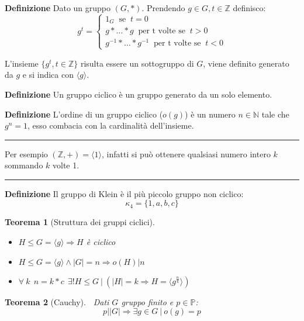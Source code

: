 \documentclass{article}
\newtheorem{theorem}{Teorema}
\begin{document}
\textbf{Definizione} Dato un gruppo $(G,*)$. Prendendo $g\in G,t\in\mathbb{Z}$ definisco:
\[g^t=
\begin{cases}
    1_G\ \text{ se }\ t=0\\
    g*\ldots*g\ \text{ per t volte se }\ t>0\\
    g^{-1}*\ldots*g^{-1}\ \text{ per t volte se }\ t<0
\end{cases}
\]

\noindent L'insieme $\{g^t,t\in\mathbb{Z}\}$ risulta essere un sottogruppo di $G$, viene definito generato da $g$ e si indica con $\langle g\rangle$.\newline

\noindent\textbf{Definizione} Un gruppo ciclico è un gruppo generato da un solo elemento.\newline

\noindent\textbf{Definizione} L'ordine di un gruppo ciclico ($o(g)$) è un numero $n\in\mathbb{N}$ tale che $g^n=1$, esso combacia con la cardinalità dell'insieme.\newline

\noindent\rule{\textwidth}{0.5pt}
    Per esempio $(\mathbb{Z},+)=\langle 1\rangle$, infatti si può ottenere qualsiasi numero intero $k$ sommando $k$ volte 1.
    
\noindent\rule{\textwidth}{0.5pt}\newline

\noindent\textbf{Definizione} Il gruppo di Klein è il più piccolo gruppo non ciclico:
$$\kappa_4=\{1,a,b,c\}$$\newline

\begin{theorem}[Struttura dei gruppi ciclici]$\ $\newline
    \begin{itemize}
        \item $H\leqslant G=\langle g\rangle\Rightarrow H$ è ciclico
        \item $H\leqslant G=\langle g\rangle\wedge|G|=n\Rightarrow o(H)|n$
        \item $\forall\ k\ \ n=k*c\ \ \exists!H\leqslant G\ |\ (|H|=k\Rightarrow H=\langle g^{\frac{n}{k}}\rangle)$\newline
    \end{itemize}
\end{theorem}

\begin{theorem}[Cauchy]$\ $\newline
    Dati $G$ gruppo finito e $p\in\mathbb{P}$:
    $$p||G|\Rightarrow\exists g\in G\ |\ o(g)=p$$
\end{theorem}
\end{document}
